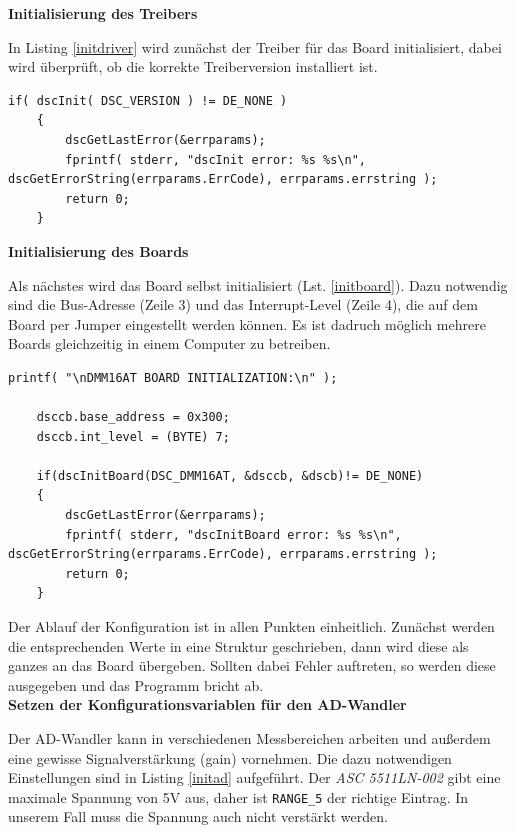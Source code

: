 \documentclass[12pt,a4paper]{scrartcl}
\begin{document}
\textbf{Initialisierung des Treibers}

In Listing \ref{initdriver} wird zunächst der Treiber für das Board initialisiert, dabei wird überprüft, ob die korrekte Treiberversion installiert ist.
\begin{lstlisting}[frame=trBL]
	if( dscInit( DSC_VERSION ) != DE_NONE )
	{
		dscGetLastError(&errparams);
		fprintf( stderr, "dscInit error: %s %s\n", dscGetErrorString(errparams.ErrCode), errparams.errstring );
		return 0;
	}
\end{lstlisting}


\textbf{Initialisierung des Boards}

Als nächstes wird das Board selbst initialisiert (Lst. \ref{initboard}). Dazu notwendig sind die Bus-Adresse (Zeile 3) und das Interrupt-Level (Zeile 4), die auf dem Board per Jumper eingestellt werden können. Es ist dadruch möglich mehrere Boards gleichzeitig in einem Computer zu betreiben.

\begin{lstlisting}[frame=trBL]
	printf( "\nDMM16AT BOARD INITIALIZATION:\n" );

	dsccb.base_address = 0x300;
	dsccb.int_level = (BYTE) 7;

	if(dscInitBoard(DSC_DMM16AT, &dsccb, &dscb)!= DE_NONE)
	{
		dscGetLastError(&errparams);
		fprintf( stderr, "dscInitBoard error: %s %s\n", dscGetErrorString(errparams.ErrCode), errparams.errstring );
		return 0;
	}
\end{lstlisting}

Der Ablauf der Konfiguration ist in allen Punkten einheitlich. Zunächst werden die entsprechenden Werte in eine Struktur geschrieben, dann wird diese als ganzes an das Board übergeben. Sollten dabei Fehler auftreten, so werden diese ausgegeben und das Programm bricht ab. \\

\textbf{Setzen der Konfigurationsvariablen für den AD-Wandler}

Der AD-Wandler kann in verschiedenen Messbereichen arbeiten und außerdem eine gewisse Signalverstärkung (gain) vornehmen. Die dazu notwendigen Einstellungen sind in Listing \ref{initad} aufgeführt. 
Der \textit{ASC 5511LN-002} gibt eine maximale Spannung von 5V aus, daher ist \texttt{RANGE\_5} der richtige Eintrag. In unserem Fall muss die Spannung auch nicht verstärkt werden. 
\end{document}
